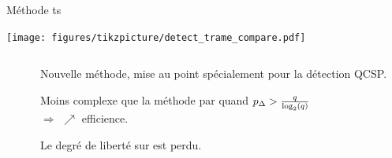 \documentclass[../main.tex]{subfiles}
\begin{document}
\begin{frame}{Méthode \acrfull{ts}}{}
  {%
    \centering
    \texttt{[image: figures/tikzpicture/detect\_trame\_compare.pdf]}
    \par%
  }%
  \begin{columns}
    \begin{column}{.45\linewidth}
      \begin{overlayarea}{\linewidth}{.5\textheight}
      \end{overlayarea}
    \end{column}
    \begin{column}{.55\linewidth}
      Nouvelle méthode, mise au point spécialement pour la détection QCSP.
      \begin{ctrlitemize}{0pt}
        \item [\bonus] Moins complexe que la méthode par \fft{} quand \textcolor{red}{$p_\Delta{} > \frac{q}{\log_2(q)}$} \cite{moniereTimeSlidingWindow2021}\\$\Rightarrow$ $\nearrow$ efficience.
        \item [\malus] Le degré de liberté sur \textcolor{red}{\pd{}} est perdu.
      \end{ctrlitemize}
    \end{column}
  \end{columns}
\end{frame}
\end{document}
